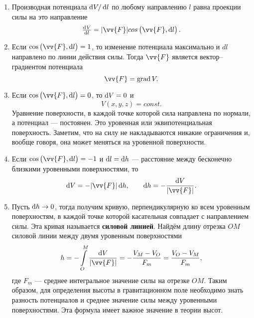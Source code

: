 \documentclass[11pt, a4paper]{article}
\theoremstyle{plain}
\theoremstyle{definition}
\theoremstyle{remark}
\begin{document}
\begin{enumerate}
    \item Производная потенциала $\dif V/ \dif l$ по любому направлению $l$ равна проекции силы на
        это направление
        \begin{equation*}
            \od{V}{l} =  |\vv{F}|cos\left( \vv{F}, \dif l \right).
        \end{equation*}
    \item Если $\cos\left( \vv{F}, \dif l \right) = 1$, то изменение потенциала максимально и
        $dl$ направлено по линии действия силы. Тогда $\vv{F}$ является вектор--градиентом
        потенциала
        \begin{equation*}
            \vv{F} = \textrm{grad}\,V.
        \end{equation*}
    \item Если $\cos\left( \vv{F}, \dif l \right) = 0$, то $\dif V = 0$ и 
        \begin{equation*}
            V\left( x, y, z \right) = const.
        \end{equation*}
        Уравнение поверхности, в каждой точке которой сила направлена по нормали, а потенциал ---
        постоянен. Это уровенная или эквипотенциальная поверхность. Заметим, что на силу не
        накладываются никакие ограничения и, вообще говоря, она может меняться на уровенной
        поверхности.
    \item Если $\cos\left( \vv{F}, \dif l \right) = -1$ и $\dif l = \dif h$ --- расстояние между
        бесконечно близкими уровенными поверхностями, то
        \begin{equation*}
            \dif V = - |\vv{F}| \dif h, \qquad \dif h = -\dfrac{\dif V}{|\vv{F}|}.     
        \end{equation*}
    \item Пусть $\dif h\to 0$, тогда получим кривую, перпендикулярную ко всем уровенным
        поверхностям, в каждой точке которой касательная совпадает с направлением силы. Эта кривая
        называется \textbf{силовой линией}. Найдём длину отрезка $OM$ силовой линии между двумя уровенным
        поверхностями
        \begin{equation*}
            h = -\int\limits_{O}^{M} \dfrac{\dif V}{|\vv{F}|} = - \dfrac{V_M - V_O}{F_m} =
            \dfrac{V_O - V_M}{F_m},
        \end{equation*}
        где $F_m$ --- среднее интегральное значение силы на отрезке $OM$. Таким образом, для
        определения высоты в гравитационном поле необходимо знать разность потенциалов и среднее
        значение силы между уровенными поверхностями. Эта формула имеет важное значение в теории
        высот.
\end{enumerate}

\end{document}
